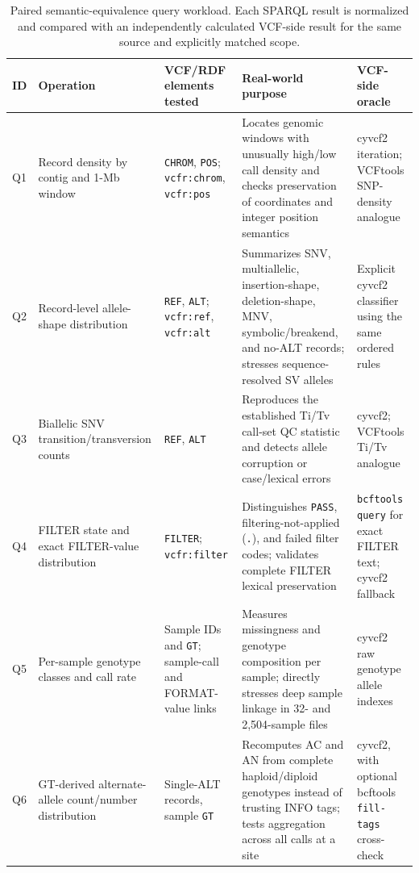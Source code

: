 \documentclass[pdflatex,sn-mathphys-num]{sn-jnl}%
\newenvironment{revision}{\begingroup\color{revisionblue}}{\endgroup}%
\theoremstyle{thmstyleone}%
\theoremstyle{thmstyletwo}%
\theoremstyle{thmstylethree}%
\begin{document}
\begin{revision}
\begin{table}[t]
\caption{Paired semantic-equivalence query workload. Each SPARQL result is normalized and compared with an independently calculated VCF-side result for the same source and explicitly matched scope.}\label{tab:semantic-queries}%
\centering
\scriptsize
\setlength{\tabcolsep}{3pt}
\renewcommand{\arraystretch}{0.98}
\begin{tabularx}{\textwidth}{@{}p{}p{}p{}X p{}@{}}
\toprule
\textbf{ID} & \textbf{Operation} & \textbf{VCF/RDF elements tested} & \textbf{Real-world purpose} & \textbf{VCF-side oracle} \\
\midrule
Q1 & Record density by contig and 1-Mb window & \texttt{CHROM}, \texttt{POS}; \texttt{vcfr:chrom}, \texttt{vcfr:pos} & Locates genomic windows with unusually high/low call density and checks preservation of coordinates and integer position semantics & cyvcf2 iteration; VCFtools SNP-density analogue \\
Q2 & Record-level allele-shape distribution & \texttt{REF}, \texttt{ALT}; \texttt{vcfr:ref}, \texttt{vcfr:alt} & Summarizes SNV, multiallelic, insertion-shape, deletion-shape, MNV, symbolic/breakend, and no-ALT records; stresses sequence-resolved SV alleles & Explicit cyvcf2 classifier using the same ordered rules \\
Q3 & Biallelic SNV transition/transversion counts & \texttt{REF}, \texttt{ALT} & Reproduces the established Ti/Tv call-set QC statistic and detects allele corruption or case/lexical errors & cyvcf2; VCFtools Ti/Tv analogue \\
Q4 & FILTER state and exact FILTER-value distribution & \texttt{FILTER}; \texttt{vcfr:filter} & Distinguishes \texttt{PASS}, filtering-not-applied (\texttt{.}), and failed filter codes; validates complete FILTER lexical preservation & \texttt{bcftools query} for exact FILTER text; cyvcf2 fallback \\
Q5 & Per-sample genotype classes and call rate & Sample IDs and \texttt{GT}; sample-call and FORMAT-value links & Measures missingness and genotype composition per sample; directly stresses deep sample linkage in 32- and 2,504-sample files & cyvcf2 raw genotype allele indexes \\
Q6 & GT-derived alternate-allele count/number distribution & Single-ALT records, sample \texttt{GT} & Recomputes AC and AN from complete haploid/diploid genotypes instead of trusting INFO tags; tests aggregation across all calls at a site & cyvcf2, with optional bcftools \texttt{fill-tags} cross-check \\
\bottomrule
\end{tabularx}
\end{table}


\end{revision}
\end{document}
